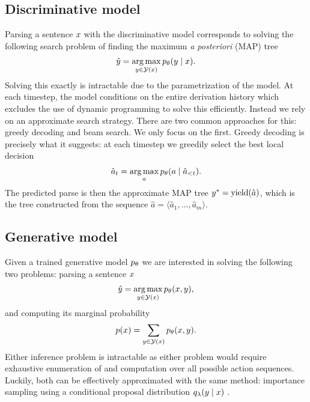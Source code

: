   \subsection{Discriminative model}
    Parsing a sentence $x$ with the discriminative model corresponds to solving the following search problem of finding the maximum \textit{a posteriori} (MAP) tree
    \begin{align*}
      \hat{y} = \operatorname*{arg\,max}_{ y \in \mathcal{Y}(x) } p_{\theta}(y \mid x).
    \end{align*}
    Solving this exactly is intractable due to the parametrization of the model. At each timestep, the model conditions on the entire derivation history which excludes the use of dynamic programming to solve this efficiently. Instead we rely on an approximate search strategy. There are two common approaches for this: greedy decoding and beam search. We only focus on the first. Greedy decoding is precisely what it suggests: at each timestep we greedily select the best local decision
    \begin{align*}
      \hat{a}_t = \operatorname*{arg\,max}_{a} p_{\theta}(a \mid \hat{a}_{< t}).
    \end{align*}
    The predicted parse is then the approximate MAP tree $y^* = \text{yield}(\hat{a})$, which is the tree constructed from the sequence $\hat{a} = \langle \hat{a}_1, \dots, \hat{a}_m \rangle$.

  \subsection{Generative model}
    Given a trained generative model $p_{\theta}$ we are interested in solving the following two problems: parsing a sentence $x$
    \begin{align*}
      \hat{y} = \operatorname*{arg\,max}_{ y \in \mathcal{Y}(x) } p_{\theta}(x, y),
    \end{align*}
    and computing its marginal probability
    \begin{align*}
      p(x) = \sum_{ y \in \mathcal{Y}(x) } p_{\theta}(x, y).
    \end{align*}
    Either inference problem is intractable as either problem would require exhaustive enumeration of and computation over all possible action sequences.  Luckily, both can be effectively approximated with the same method: importance sampling using a conditional proposal distribution $q_{\lambda}(y \mid x)$ \citep{dyer2016rnng}.

